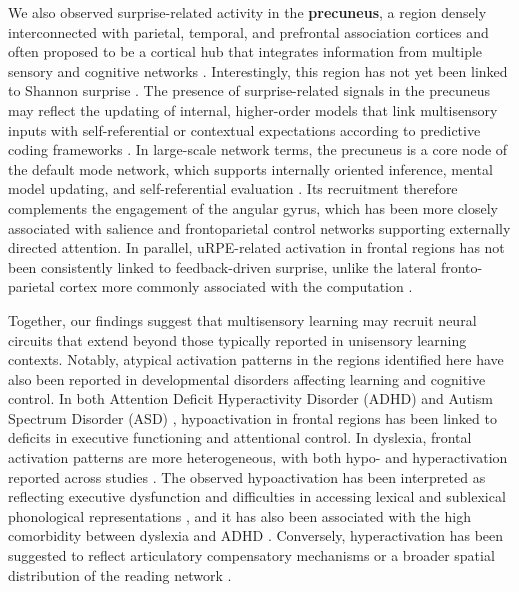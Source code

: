 \documentclass{article}
\begin{document}
We also observed surprise-related activity in the \textbf{precuneus}, a region densely interconnected with parietal, temporal, and prefrontal association cortices and often proposed to be a cortical hub that integrates information from multiple sensory and cognitive networks \cite{yamaguchi2024structural, jitsuishi2023characteristic, cavanna2006precuneus}. Interestingly, this region has not yet been linked to Shannon surprise \cite{visalli2019bayesian, konovalov2018neurocomputational, o2013dissociable, corlett2022meta}. The presence of surprise-related signals in the precuneus may reflect the updating of internal, higher-order models that link multisensory inputs with self-referential or contextual expectations according to predictive coding frameworks \cite{friston2005theory}. In large-scale network terms, the precuneus is a core node of the default mode network, which supports internally oriented inference, mental model updating, and self-referential evaluation \cite{cavanna2006precuneus, yamaguchi2024structural, yazin2025fragmentation}. Its recruitment therefore complements the engagement of the angular gyrus, which has been more closely associated with salience and frontoparietal control networks supporting externally directed attention. In parallel, uRPE-related activation in frontal regions has not been consistently linked to feedback-driven surprise, unlike the lateral fronto-parietal cortex more commonly associated with the computation \cite{fouragnan2018separate, corlett2022meta}.\newline

Together, our findings suggest that multisensory learning may recruit neural circuits that extend beyond those typically reported in unisensory learning contexts. Notably, atypical activation patterns in the regions identified here have also been reported in developmental disorders affecting learning and cognitive control. In both Attention Deficit Hyperactivity Disorder (ADHD) \cite{dickstein2006neural, cortese2012toward} and Autism Spectrum Disorder (ASD) \cite{may2020frontoparietal}, hypoactivation in frontal regions has been linked to deficits in executive functioning and attentional control. In dyslexia, frontal activation patterns are more heterogeneous, with both hypo- and hyperactivation reported across studies \cite{richlan2009functional, maisog2008meta}. The observed hypoactivation has been interpreted as reflecting executive dysfunction \cite{lonergan2019meta} and difficulties in accessing lexical and sublexical phonological representations \cite{richlan2009functional}, and it has also been associated with the high comorbidity between dyslexia and ADHD \cite{lonergan2019meta}. Conversely, hyperactivation has been suggested to reflect articulatory compensatory mechanisms \cite{richlan2009functional} or a broader spatial distribution of the reading network \cite{pollack2015meta}.
\end{document}
